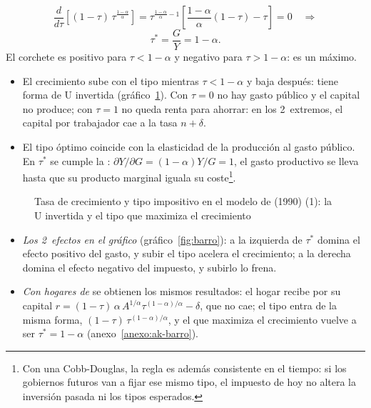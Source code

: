\documentclass[11pt]{article}
\begin{document}
\begin{itemize}
  \[\frac{d}{d\tau}\left[(1-\tau)\,\tau^{\frac{1-\alpha}{\alpha}}\right]=\tau^{\frac{1-\alpha}{\alpha}-1}\left[\frac{1-\alpha}{\alpha}(1-\tau)-\tau\right]=0\quad\Longrightarrow\]
  \begin{equation}
  \tau^*=\frac{G}{Y}=1-\alpha.\label{eq:barro-tau}
  \end{equation}
  El corchete es positivo para $\tau<1-\alpha$ y negativo para $\tau>1-\alpha$: es un máximo.
  \begin{itemize}
  \item El crecimiento sube con el tipo mientras $\tau<1-\alpha$ y baja después: tiene forma de U invertida (gráfico~\ref{fig:barro-1}). Con $\tau=0$ no hay gasto público y el capital no produce; con $\tau=1$ no queda renta para ahorrar: en los 2~extremos, el capital por trabajador cae a la tasa $n+\delta$.
  \item El tipo óptimo coincide con la elasticidad de la producción al gasto público. En $\tau^*$ se cumple la : $\partial Y/\partial G=(1-\alpha)Y/G=1$, el gasto productivo se lleva hasta que su producto marginal iguala su coste\footnote{Con una Cobb-Douglas, la regla es además consistente en el tiempo: si los gobiernos futuros van a fijar ese mismo tipo, el impuesto de hoy no altera la inversión pasada ni los tipos esperados\nocite{Barro1990}.}.
  \end{itemize}
\end{itemize}

\begin{figure}[H]
\centering
\caption{Tasa de crecimiento y tipo impositivo en el modelo de  (1990) (1): la U invertida y el tipo que maximiza el crecimiento}\label{fig:barro-1}
\end{figure}

\begin{itemize}
\item \emph{Los 2~efectos en el gráfico} (gráfico~\ref{fig:barro}): a la izquierda de $\tau^*$ domina el \textcolor{tceeverde}{efecto positivo del gasto}, y subir el tipo acelera el crecimiento; a la derecha domina el \textcolor{tceerojo}{efecto negativo del impuesto}, y subirlo lo frena.
\item \emph{Con hogares de } se obtienen los mismos resultados: el hogar recibe por su capital $r=(1-\tau)\,\alpha\,A^{1/\alpha}\tau^{(1-\alpha)/\alpha}-\delta$, que no cae; el tipo entra de la misma forma, $(1-\tau)\,\tau^{(1-\alpha)/\alpha}$, y el que maximiza el crecimiento vuelve a ser $\tau^*=1-\alpha$ (anexo~\ref{anexo:ak-barro}).
\end{itemize}
\end{document}
